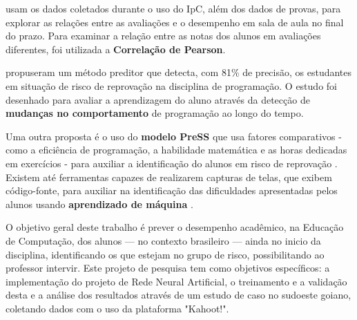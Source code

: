 \documentclass[
	12pt,				%
	openright,			%
	oneside,
	a4paper,			%
	english,			%
	french,				%
	spanish,			%
	brazil,				%
	]{abntex2}
\begin{document}
 usam os dados coletados durante o uso do IpC, além dos dados de provas, para explorar as relações entre as avaliações e o desempenho em sala de aula no final do prazo. Para examinar a relação entre as notas dos alunos em avaliações diferentes, foi utilizada a \textbf{Correlação de Pearson}.

 propuseram um método preditor que detecta, com 81\% de precisão, os estudantes em situação de risco de reprovação na disciplina de programação. O estudo foi desenhado para avaliar a aprendizagem do aluno através da detecção de \textbf{mudanças no comportamento} de programação ao longo do tempo. 

 Uma outra proposta é o uso do \textbf{modelo PreSS} que usa fatores comparativos - como a eficiência de programação, a habilidade matemática  e as horas dedicadas em exercícios - para auxiliar a identificação do alunos em risco de reprovação \cite{quille2018}. Existem até ferramentas capazes de realizarem capturas de telas, que exibem código-fonte, para auxiliar na identificação das dificuldades apresentadas pelos alunos usando \textbf{aprendizado de máquina} \cite{ahadi2016early}.
 
O objetivo geral deste trabalho é prever o desempenho acadêmico, na Educação de Computação, dos alunos --- no contexto brasileiro --- ainda no inicio da disciplina, identificando os que estejam no grupo de risco, possibilitando ao professor intervir. Este projeto de pesquisa tem como objetivos específicos: a implementação do projeto de Rede Neural Artificial, o treinamento e a validação desta e a análise dos resultados através de um estudo de caso no sudoeste goiano, coletando dados com o uso da plataforma "Kahoot!".


\end{document}
